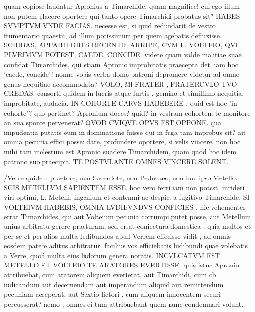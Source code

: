  quam copiose laudatur Apronius a Timarchide, quam magnifice! cui ego illum non putem placere oportere qui tanto opere Timarchidi probatus sit? HABES SVMPTVM VNDE FACIAS. necesse est, si quid redundarit de vestro frumentario quaestu, ad illum potissimum per quem agebatis defluxisse. SCRIBAS, APPARITORES RECENTIS ARRIPE; CVM L. VOLTEIO, QVI PLVRIMVM POTEST, CAEDE, CONCIDE. videte quam valde malitiae suae confidat Timarchides, qui etiam Apronio improbitatis praecepta det. iam hoc 'caede, concide'! nonne vobis verba domo patroni depromere videtur ad omne genus nequitiae accommodata? VOLO, Ml FRATER , FRATERCVLO TVO CREDAS. consorti quidem in lucris atque furtis , gemino et simillimo nequitia, improbitate, audacia. IN COHORTE CARVS HABEBERE . quid est hoc 'in cohorte'? quo pertinet? Apronium doces? quid? in vestram cohortem te monitore an sua sponte pervenerat? QVOD CVIQVE OPVS EST,OPPONE. qua impudentia putatis eum in dominatione fuisse qui in fuga tam improbus sit? ait omnia pecunia effici posse: dare, profundere oportere, si velis vincere. non hoc mihi tam molestum est Apronio suadere Timarchidem, quam quod hoc idem patrono suo praecipit. TE POSTVLANTE OMNES VINCERE SOLENT.

 /Verre quidem praetore, non Sacerdote, non Peducaeo, non hoc ipso Metello. SCIS METELLVM SAPIENTEM ESSE. hoc vero ferri iam non potest, inrideri viri optimi, L. Metelli, ingenium et contemni ac despici a fugitivo Timarchide. SI VOLTEIVM HABEBIS, OMNIA LVDIBVNDVS CONFICIES . hic vehementer errat Timarchides, qui aut Volteium pecunia corrumpi putet posse, aut Metellum unius arbitratu gerere praeturam, sed errat coniectura domestica . quia multos et per se et per alios multa ludibundos apud Verrem effecisse vidit , ad omnis eosdem patere aditus arbitratur. facilius vos efficiebatis ludibundi quae volebatis a Verre, quod multa eius ludorum genera noratis. INCVLCATVM EST METELLO ET VOLTEIO TE ARATORES EVERTISSE. quis istuc Apronio attribuebat, cum aratorem aliquem everterat, aut Timarchidi, cum ob iudicandum aut decernendum aut imperandum aliquid aut remittendum pecuniam acceperat, aut Sextio lictori , cum aliquem innocentem securi percusserat? nemo ; omnes ei tum attribuebant quem nunc condemnari volunt.

